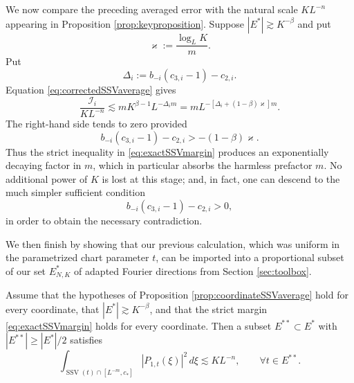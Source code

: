 \documentclass[12pt]{amsart}
\numberwithin{equation}{section}
\begin{document}
We now compare the preceding averaged error with the natural scale $KL^{-n}$ appearing in Proposition \ref{prop:keyproposition}.  Suppose $|E^*|\gtrsim K^{-\beta}$ and put
\[
 \varkappa:=\frac{\log_LK}{m}.
\]
Put
\[
 \Delta_i:=b_{-i}(c_{3,i}-1)-c_{2,i}.
\]
Equation \eqref{eq:correctedSSVaverage} gives
\begin{equation}\label{eq:ssv-margin-calculation}
 \frac{\mathcal I_i}{KL^{-n}}
 \lesssim mK^{\beta-1}L^{-\Delta_im}
 =mL^{-[\Delta_i+(1-\beta)\varkappa]m}.
\end{equation}
The right-hand side tends to zero provided
\begin{equation}\label{eq:exactSSVmargin}
 b_{-i}(c_{3,i}-1)-c_{2,i}
 >-(1-\beta)\varkappa.
\end{equation}
Thus the strict inequality in \eqref{eq:exactSSVmargin} produces an exponentially decaying factor in $m$, which in particular absorbs the harmless prefactor $m$.  No additional power of $K$ is lost at this stage; and, in fact, one can descend to the much simpler sufficient condition
\begin{equation}\label{eq:coordinatewiserestrictionSSVconstants}
 b_{-i}(c_{3,i}-1)-c_{2,i}>0,
\end{equation}
in order to obtain the necessary contradiction.

We then finish by showing that our previous calculation, which was uniform in the parametrized chart parameter $t$, can be imported into a proportional subset of our set $E_{N,K}^*$ of adapted Fourier directions from Section \ref{sec:toolbox}.

\begin{corollary}\label{cor:ssvgooddirection}
Assume that the hypotheses of Proposition
\ref{prop:coordinateSSVaverage} hold for every coordinate, that
$|E^*|\gtrsim K^{-\beta}$, and that the strict margin
\eqref{eq:exactSSVmargin} holds for every coordinate.  Then a subset
$E^{**}\subset E^*$ with $|E^{**}|\geq|E^*|/2$ satisfies
\[
 \int_{\operatorname{SSV}(t)\cap[L^{-m},c_*]}
 |P_{1,t}(\xi)|^2\,d\xi
 \lesssim KL^{-n},
 \qquad \forall t\in E^{**}.
\]
\end{corollary}
\end{document}
